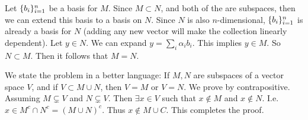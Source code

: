 \begin{problem}
	\begin{solution}
		Let $ \{b_i\}_{i=1}^n $ be a basis for $ M $. Since $ M\subset N $, and both of the are subspaces, then we can extend this basis to a basis on $ N $. Since $ N $ is also $ n $-dimensional, $ \{b_i\}_{i=1}^n $ is already a basis for $ N $ (adding any new vector will make the collection linearly dependent). Let $ y \in N $. We can expand $ y = \sum_i \alpha_i b_i $. This implies $ y \in M $. So $ N \subset M $. Then it follows that $ M = N $.
	\end{solution}
\end{problem}


\begin{problem}
	\begin{solution}
		We state the problem in a better language: If $ M,N $ are subspaces of a vector space $ V $, and if $ V \subset M \cup N $, then $ V = M $ or $ V = N $. We prove by contrapositive. Assuming $ M\varsubsetneq V $ and $ N\varsubsetneq V $. Then $ \exists x \in V $ such that $ x \notin M $ and $ x\notin N $. I.e. $ x \in M^c \cap N^c = (M\cup N)^c $. Thus $ x \notin M\cup C $.
		This completes the proof.
	\end{solution}
\end{problem}





